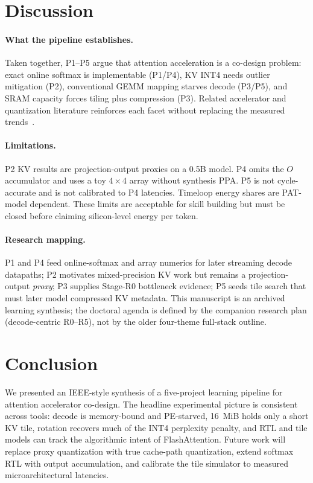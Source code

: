 \documentclass[conference]{IEEEtran}
\begin{document}
\section{Discussion}
\label{sec:disc}

\paragraph{What the pipeline establishes.}
Taken together, P1--P5 argue that attention acceleration is a co-design problem: exact online softmax is implementable (P1/P4), KV INT4 needs outlier mitigation (P2), conventional GEMM mapping starves decode (P3/P5), and SRAM capacity forces tiling plus compression (P3).
Related accelerator and quantization literature reinforces each facet without replacing the measured trends~\cite{lin2025systolicattention,desa2025,liu2024kivi,bitdecoding2025}.

\paragraph{Limitations.}
P2 KV results are projection-output proxies on a 0.5B model.
P4 omits the $O$ accumulator and uses a toy $4\times4$ array without synthesis PPA.
P5 is not cycle-accurate and is not calibrated to P4 latencies.
Timeloop energy shares are PAT-model dependent.
These limits are acceptable for skill building but must be closed before claiming silicon-level energy per token.

\paragraph{Research mapping.}
P1 and P4 feed online-softmax and array numerics for later streaming decode datapaths; P2 motivates mixed-precision KV work but remains a projection-output \emph{proxy}; P3 supplies Stage-R0 bottleneck evidence; P5 seeds tile search that must later model compressed KV metadata.
This manuscript is an archived learning synthesis; the doctoral agenda is defined by the companion research plan (decode-centric R0--R5), not by the older four-theme full-stack outline.

\section{Conclusion}
\label{sec:concl}

We presented an IEEE-style synthesis of a five-project learning pipeline for attention accelerator co-design.
The headline experimental picture is consistent across tools: decode is memory-bound and PE-starved, 16~MiB holds only a short KV tile, rotation recovers much of the INT4 perplexity penalty, and RTL and tile models can track the algorithmic intent of FlashAttention.
Future work will replace proxy quantization with true cache-path quantization, extend softmax RTL with output accumulation, and calibrate the tile simulator to measured microarchitectural latencies.
\end{document}
